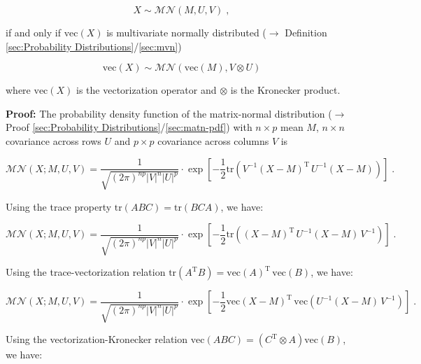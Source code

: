 \documentclass[a4paper,12pt]{book}
\begin{document}
\begin{equation} \label{eq:matn-mvn-matn}
X \sim \mathcal{MN}(M, U, V) \; ,
\end{equation}

if and only if $\mathrm{vec}(X)$ is multivariate normally distributed ($\rightarrow$ Definition \ref{sec:Probability Distributions}/\ref{sec:mvn})

\begin{equation} \label{eq:matn-mvn-mvn}
\mathrm{vec}(X) \sim \mathcal{MN}(\mathrm{vec}(M), V \otimes U)
\end{equation}

where $\mathrm{vec}(X)$ is the vectorization operator and $\otimes$ is the Kronecker product.


\vspace{1em}
\textbf{Proof:} The probability density function of the matrix-normal distribution ($\rightarrow$ Proof \ref{sec:Probability Distributions}/\ref{sec:matn-pdf}) with $n \times p$ mean $M$, $n \times n$ covariance across rows $U$ and $p \times p$ covariance across columns $V$ is

\begin{equation} \label{eq:matn-mvn-matn-pdf}
\mathcal{MN}(X; M, U, V) = \frac{1}{\sqrt{(2\pi)^{np} |V|^n |U|^p}} \cdot \exp\left[-\frac{1}{2} \mathrm{tr}\left( V^{-1} (X-M)^\mathrm{T} \, U^{-1} (X-M) \right) \right] \; .
\end{equation}

Using the trace property $\mathrm{tr}(ABC) = \mathrm{tr}(BCA)$, we have:

\begin{equation} \label{eq:matn-mvn-matn-mvn-s1}
\mathcal{MN}(X; M, U, V) = \frac{1}{\sqrt{(2\pi)^{np} |V|^n |U|^p}} \cdot \exp\left[-\frac{1}{2} \mathrm{tr}\left( (X-M)^\mathrm{T} \, U^{-1} (X-M) \, V^{-1} \right) \right] \; .
\end{equation}

Using the trace-vectorization relation $\mathrm{tr}(A^\mathrm{T} B) = \mathrm{vec}(A)^\mathrm{T} \, \mathrm{vec}(B)$, we have:

\begin{equation} \label{eq:matn-mvn-matn-mvn-s2}
\mathcal{MN}(X; M, U, V) = \frac{1}{\sqrt{(2\pi)^{np} |V|^n |U|^p}} \cdot \exp\left[-\frac{1}{2} \mathrm{vec}(X-M)^\mathrm{T} \, \mathrm{vec}\left( U^{-1} (X-M) \, V^{-1} \right) \right] \; .
\end{equation}

Using the vectorization-Kronecker relation $\mathrm{vec}(ABC) = \left( C^\mathrm{T} \otimes A \right) \mathrm{vec}(B)$, we have:
\end{document}
